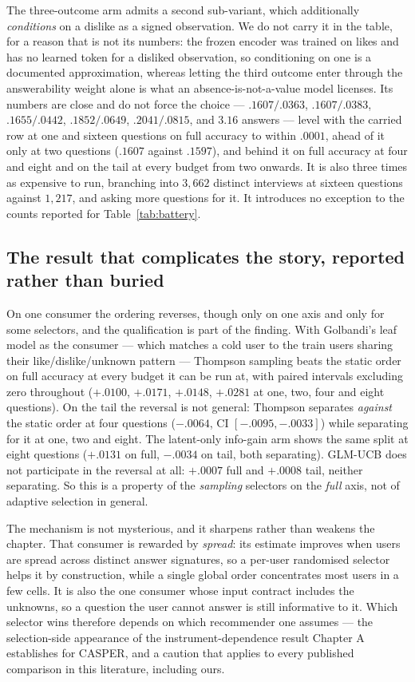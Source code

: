 \documentclass[11pt]{article}
\begin{document}
The three-outcome arm admits a second sub-variant, which additionally \emph{conditions} on a dislike
as a signed observation. We do not carry it in the table, for a reason that is not its numbers: the
frozen encoder was trained on likes and has no learned token for a disliked observation, so
conditioning on one is a documented approximation, whereas letting the third outcome enter through
the answerability weight alone is what an absence-is-not-a-value model licenses. Its numbers are
close and do not force the choice --- $.1607/.0363$, $.1607/.0383$, $.1655/.0442$, $.1852/.0649$,
$.2041/.0815$, and $3.16$ answers --- level with the carried row at one and sixteen questions on
full accuracy to within $.0001$, ahead of it only at two questions ($.1607$ against $.1597$), and
behind it on full accuracy at four and eight and on the tail at every budget from two onwards. It is
also three times as expensive to run, branching into $3{,}662$ distinct interviews at sixteen
questions against $1{,}217$, and asking more questions for it. It introduces no exception to the
counts reported for Table~\ref{tab:battery}.

\subsection{The result that complicates the story, reported rather than buried}
\label{sec:flip}

On one consumer the ordering reverses, though only on one axis and only for some selectors, and the
qualification is part of the finding. With Golbandi's leaf model as the consumer --- which matches a
cold user to the train users sharing their like/dislike/unknown pattern --- Thompson sampling beats
the static order on full accuracy at every budget it can be run at, with paired intervals excluding
zero throughout ($+.0100$, $+.0171$, $+.0148$, $+.0281$ at one, two, four and eight questions).
On the tail the reversal is not general: Thompson separates \emph{against} the static order at four
questions ($-.0064$, CI $[-.0095,-.0033]$) while separating for it at one, two and eight. The
latent-only info-gain arm shows the same split at eight questions ($+.0131$ on full,
$-.0034$ on tail, both separating). GLM-UCB does not participate in the reversal at all: $+.0007$
full and $+.0008$ tail, neither separating. So this is a property of the \emph{sampling} selectors
on the \emph{full} axis, not of adaptive selection in general.

The mechanism is not mysterious, and it sharpens rather than weakens the chapter. That consumer is
rewarded by \emph{spread}: its estimate improves when users are spread across distinct answer
signatures, so a per-user randomised selector helps it by construction, while a single global order
concentrates most users in a few cells. It is also the one consumer whose input contract includes
the unknowns, so a question the user cannot answer is still informative to it. Which selector wins
therefore depends on which recommender one assumes --- the selection-side appearance of the
instrument-dependence result Chapter A establishes for CASPER, and a caution that applies to every published comparison in this
literature, including ours.
\end{document}
